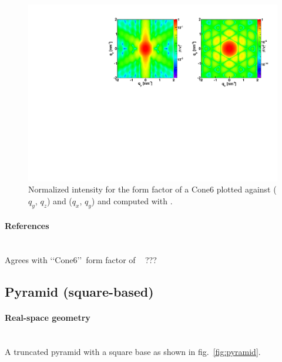 \begin{figure}[ht]
\begin{center}
\includegraphics[angle=-90,width=\textwidth]{fig/ff/figffcone6.pdf}
\end{center}
\caption{Normalized intensity for the form factor of a Cone6 plotted against ($q_y$, $q_z$) and ($q_x$, $q_y$) and computed with .}
\label{fig:FFCone6Ex}
\end{figure}

\paragraph{References}\strut\\
Agrees with \lq\lq Cone6\rq\rq\ form factor of \IsGISAXS~\cite{Laz02} ???

\newpage
\subsection{Pyramid (square-based)}

\paragraph{Real-space geometry}\strut\\
A truncated pyramid with a square base as shown in fig.~\ref{fig:pyramid}.

